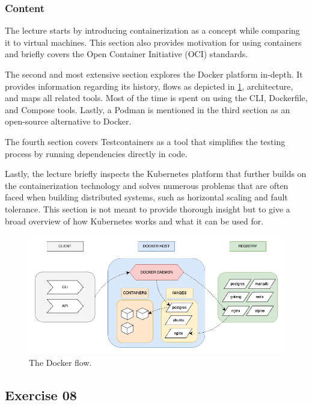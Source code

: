 \documentclass[
  digital,
  color,
  oneside,
  nosansbold,
  nocolorbold,
  nolof,
  nolot,
]{fithesis4}
\begin{document}
\subsubsection{Content}

The lecture starts by introducing containerization as a concept while comparing it to virtual machines. This section also provides motivation for using containers and briefly covers the Open Container Initiative (OCI) standards.

The second and most extensive section explores the Docker\cite{docker} platform in-depth. It provides information regarding its history, flows as depicted in \cref{fig:docker}, architecture, and maps all related tools. Most of the time is spent on using the CLI, Dockerfile, and Compose tools. Lastly, a Podman\cite{podman} is mentioned in the third section as an open-source alternative to Docker.

The fourth section covers Testcontainers\cite{testcontainers} as a tool that simplifies the testing process by running dependencies directly in code.

Lastly, the lecture briefly inspects the Kubernetes\cite{kubernetes} platform that further builds on the containerization technology and solves numerous problems that are often faced when building distributed systems, such as horizontal scaling and fault tolerance. This section is not meant to provide thorough insight but to give a broad overview of how Kubernetes works and what it can be used for.

\begin{figure}[H]
    \centering
    \includegraphics[width=12cm]{figures/docker.png}
    \caption{The Docker flow.}
    \label{fig:docker}
\end{figure}

\subsection{Exercise 08}\label{exercise-08}
\end{document}
